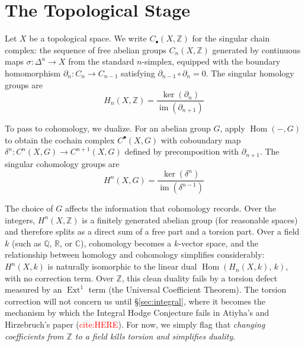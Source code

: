 \documentclass{article}
\newcommand{\C}{\mathbb{C}}
\newcommand{\Q}{\mathbb{Q}}
\newcommand{\R}{\mathbb{R}}
\newcommand{\Z}{{\mathbb{Z}}}
\newcommand{\im}{\operatorname{im}}
\newcommand{\Hom}{\operatorname{Hom}}
\newcommand{\Ext}{\operatorname{Ext}}
\begin{document}



\section{The Topological Stage}\label{sec:topology}

Let $X$ be a topological space. We write $C_\bullet(X, \Z)$ for the singular
chain complex: the sequence of free abelian groups $C_n(X, \Z)$ generated by
continuous maps $\sigma: \Delta^n \to X$ from the standard $n$-simplex,
equipped with the boundary homomorphism $\partial_n: C_n \to C_{n-1}$
satisfying $\partial_{n-1} \circ \partial_n = 0$. The singular homology groups
are
\[
  H_n(X, \Z) = \frac{\ker(\partial_n)}{\im(\partial_{n+1})}
\]

To pass to cohomology, we dualize. For an abelian group $G$, apply
$\Hom(-, G)$ to obtain the cochain complex $C^\bullet(X, G)$ with coboundary
map $\delta^n: C^n(X,G) \to C^{n+1}(X,G)$ defined by precomposition with
$\partial_{n+1}$. The singular cohomology groups are
\[
  H^n(X, G) = \frac{\ker(\delta^n)}{\im(\delta^{n-1})}
\]

The choice of $G$ affects the information
that cohomology records. Over the integers, $H^n(X, \Z)$ is a finitely
generated abelian group (for reasonable spaces) and therefore splits as a
direct sum of a free part and a torsion part. Over a field $k$ (such as $\Q$,
$\R$, or $\C$), cohomology becomes a $k$-vector space, and the relationship
between homology and cohomology simplifies considerably: $H^n(X, k)$ is
naturally isomorphic to the linear dual $\Hom(H_n(X, k),\, k)$, with no
correction term. Over $\Z$, this clean duality fails by a torsion defect
measured by an $\Ext^1$ term (the Universal Coefficient Theorem). The torsion
correction will not concern us until \S\ref{sec:integral}, where it becomes the
mechanism by which the Integral Hodge Conjecture fails in Atiyha's and Hirzebruch's paper
(\textcolor{red}{cite:HERE}). For now, we simply flag
that \emph{changing coefficients from $\Z$ to a field kills torsion and
simplifies duality}.
\end{document}
